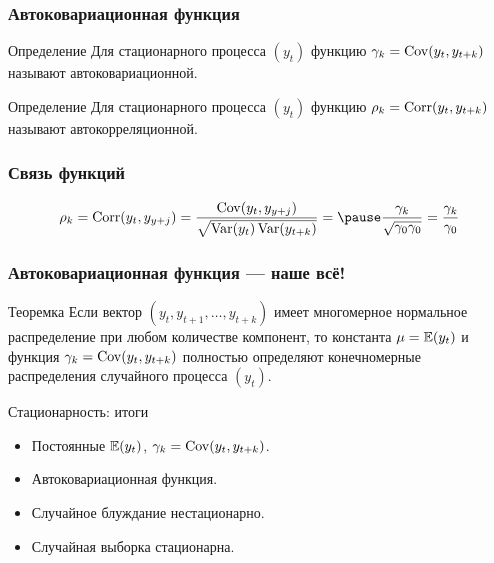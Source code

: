 \begin{frame}
  \frametitle{Автоковариационная функция}

  \begin{block}{Определение}
    Для стационарного процесса $(y_t)$ функцию $\gamma_k = \operatorname{Cov}(y_t, y_{t+k})$ 
    называют \alert{автоковариационной}. 
  \end{block}
  
  \pause
  \begin{block}{Определение}
    Для стационарного процесса $(y_t)$ функцию $\rho_k = \operatorname{Corr}(y_t, y_{t+k})$ 
    называют \alert{автокорреляционной}. 
  \end{block}
\end{frame}


\begin{frame}
  \frametitle{Связь функций}

\[
\rho_k = \Corr(y_t, y_{y+j}) = \frac{\Cov(y_t, y_{y+j})}{\sqrt{\Var(y_t)\Var(y_{t+k})}} =  \pause
\frac{\gamma_k}{\sqrt{\gamma_0 \gamma_0 }} = \frac{\gamma_k}{\gamma_0}
\]  

\end{frame}



\begin{frame}
  \frametitle{Автоковариационная функция — наше всё!}

  \begin{block}{Теоремка}
    Если вектор $(y_t, y_{t+1}, \ldots, y_{t+k})$ имеет многомерное нормальное распределение 
    при любом количестве компонент, то константа $\mu = \mathbb{E}(y_t)$ и функция $\gamma_k = \operatorname{Cov}(y_t, y_{t+k})$
    полностью определяют конечномерные распределения случайного процесса $(y_t)$.
  \end{block}

\end{frame}



\begin{frame}{Стационарность: итоги}

  \begin{itemize}[<+->]
    \item Постоянные $\mathbb{E}(y_t)$, $\gamma_k = \operatorname{Cov}(y_t, y_{t+k})$.
    \item \alert{Автоковариационная} функция. 
    \item Случайное блуждание нестационарно. 
    \item Случайная выборка стационарна.
  \end{itemize}
\end{frame}

